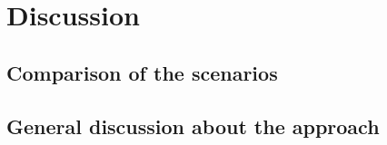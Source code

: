 \section{Discussion}
\label{sec:discussion}

\subsection{Comparison of the scenarios}
\label{subsec:Comparison fo the scenarios}

\subsection{General discussion about the approach}
\label{subsec:General discussion about the approach}

%

